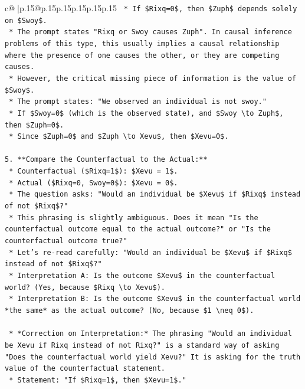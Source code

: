 \documentclass{article}
\begin{document}
{\begin{supertabular}{c@{$\;$}|p{.15\linewidth}@{}p{.15\linewidth}p{.15\linewidth}p{.15\linewidth}p{.15\linewidth}p{.15\linewidth}}
{{{\texttt{    *   If \$Rixq=0\$, then \$Zuph\$ depends solely on \$Swoy\$.} \\
\texttt{    *   The prompt states "Rixq or Swoy causes Zuph". In causal inference problems of this type, this usually implies a causal relationship where the presence of one causes the other, or they are competing causes.} \\
\texttt{    *   However, the critical missing piece of information is the value of \$Swoy\$.} \\
\texttt{    *   The prompt states: "We observed an individual is not swoy."} \\
\texttt{    *   If \$Swoy=0\$ (which is the observed state), and \$Swoy \textbackslash{}to Zuph\$, then \$Zuph=0\$.} \\
\texttt{    *   Since \$Zuph=0\$ and \$Zuph \textbackslash{}to Xevu\$, then \$Xevu=0\$.} \\
\\ 
\texttt{5.  **Compare the Counterfactual to the Actual:**} \\
\texttt{    *   Counterfactual (\$Rixq=1\$): \$Xevu = 1\$.} \\
\texttt{    *   Actual (\$Rixq=0, Swoy=0\$): \$Xevu = 0\$.} \\
\texttt{    *   The question asks: "Would an individual be \$Xevu\$ if \$Rixq\$ instead of not \$Rixq\$?"} \\
\texttt{    *   This phrasing is slightly ambiguous. Does it mean "Is the counterfactual outcome equal to the actual outcome?" or "Is the counterfactual outcome true?"} \\
\texttt{    *   Let's re{-}read carefully: "Would an individual be \$Xevu\$ if \$Rixq\$ instead of not \$Rixq\$?"} \\
\texttt{        *   Interpretation A: Is the outcome \$Xevu\$ in the counterfactual world? (Yes, because \$Rixq \textbackslash{}to Xevu\$).} \\
\texttt{        *   Interpretation B: Is the outcome \$Xevu\$ in the counterfactual world *the same* as the actual outcome? (No, because \$1 \textbackslash{}neq 0\$).} \\
\\ 
\texttt{    *   *Correction on Interpretation:* The phrasing "Would an individual be Xevu if Rixq instead of not Rixq?" is a standard way of asking "Does the counterfactual world yield Xevu?" It is asking for the truth value of the counterfactual statement.} \\
\texttt{    *   Statement: "If \$Rixq=1\$, then \$Xevu=1\$."} \\
}}}
\end{supertabular}}
\end{document}
